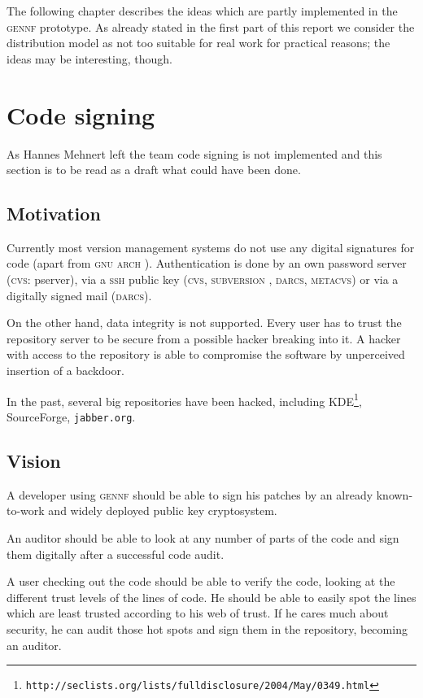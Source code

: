 \documentclass[fleqn, 10pt, a4paper]{report} \usepackage{amssymb}
\newcommand{\GENNF}{\textsc{gennf}}
\begin{document}
The following chapter describes the ideas which are partly implemented
in the \GENNF{} prototype. As already stated in the first part of this
report we consider the distribution model as not too suitable for real
work for practical reasons; the ideas may be interesting, though.


\section{Code signing \label{codesigning}}

As Hannes Mehnert left the team code signing is not implemented and
this section is to be read as a draft what could have been done.


\subsection{Motivation}

Currently most version management systems do not use any digital
signatures for code (apart from \textsc{gnu arch} \cite{Gnua06}).
Authentication is done by an own password server (\textsc{cvs}:
pserver), via a \textsc{ssh} public key (\textsc{cvs},
\textsc{subversion} \cite{Subv06}, \textsc{darcs}, \textsc{metacvs})
or via a digitally signed mail (\textsc{darcs}).

On the other hand, data integrity is not supported. Every user has to
trust the repository server to be secure from a possible hacker
breaking into it. A hacker with access to the repository is able to
compromise the software by unperceived insertion of a backdoor.

In the past, several big repositories have been hacked, including
KDE\footnote{
  \texttt{http://seclists.org/lists/fulldisclosure/2004/May/0349.html}},
SourceForge, \texttt{jabber.org}.


\subsection{Vision}

A developer using \textsc{gennf} should be able to sign his patches by
an already known-to-work and widely deployed public key cryptosystem.

An auditor should be able to look at any number of parts of the code
and sign them digitally after a successful code audit.

A user checking out the code should be able to verify the code,
looking at the different trust levels of the lines of code. He should
be able to easily spot the lines which are least trusted according to
his web of trust. If he cares much about security, he can audit those
hot spots and sign them in the repository, becoming an auditor.
\end{document}
